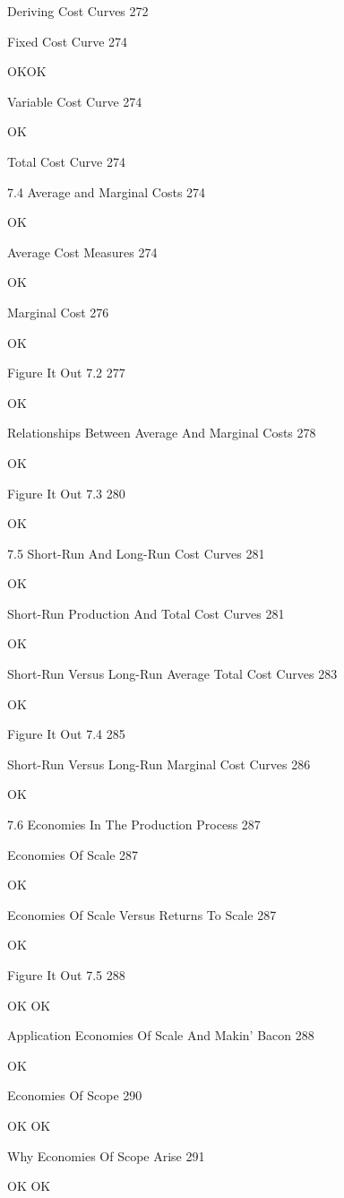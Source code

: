 Deriving Cost Curves 272



Fixed Cost Curve 274

OKOK

Variable Cost Curve 274

OK

Total Cost Curve 274



7.4 Average and Marginal Costs 274

OK

Average Cost Measures 274

OK

Marginal Cost 276

OK

Figure It Out 7.2 277

OK

Relationships Between Average And Marginal Costs 278

OK

Figure It Out 7.3 280

OK

7.5 Short-Run And Long-Run Cost Curves 281

OK

Short-Run Production And Total Cost Curves 281

OK

Short-Run Versus Long-Run Average Total Cost Curves 283

OK

Figure It Out 7.4 285



Short-Run Versus Long-Run Marginal Cost Curves 286

OK

7.6 Economies In The Production Process 287



Economies Of Scale 287

OK

Economies Of Scale Versus Returns To Scale 287

OK

Figure It Out 7.5 288

OK OK

Application Economies Of Scale And Makin' Bacon 288

OK

Economies Of Scope 290

OK OK

Why Economies Of Scope Arise 291

OK OK

